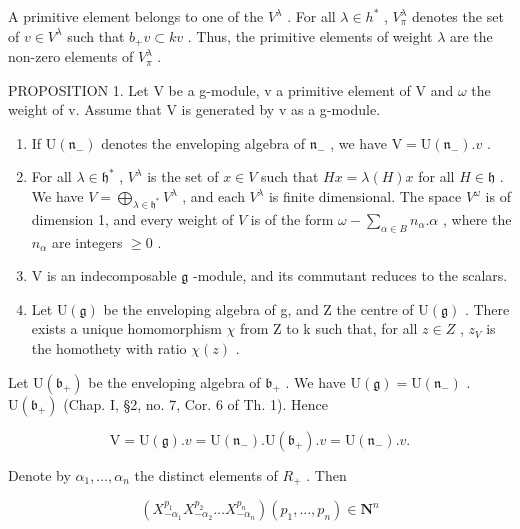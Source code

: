 A primitive element belongs to one of the \(V^{\lambda}\) . For all \(\lambda\in h^{*}\) , \(V_{\pi}^{\lambda}\) denotes the set of \(v\in V^{\lambda}\) such that \(b_{+}v\subset kv\) . Thus, the primitive elements of weight \(\lambda\) are the non-zero elements of \(V_{\pi}^{\lambda}\) .

PROPOSITION 1. Let V be a g-module, v a primitive element of V and \(\omega\) the weight of v. Assume that V is generated by v as a g-module.

\begin{enumerate}
\def\labelenumi{(\roman{enumi})}
\item
  If \(\mathrm{U}(\mathfrak{n}_{-})\) denotes the enveloping algebra of \(\mathfrak{n}_{-}\) , we have \(\mathrm{V} = \mathrm{U}(\mathfrak{n}_{-}).v\) .
\item
  For all \(\lambda \in \mathfrak{h}^*\) , \(V^{\lambda}\) is the set of \(x \in V\) such that \(Hx = \lambda(H)x\) for all \(H \in \mathfrak{h}\) . We have \(V = \bigoplus_{\lambda \in \mathfrak{h}^*} V^{\lambda}\) , and each \(V^{\lambda}\) is finite dimensional. The space \(V^{\omega}\) is of dimension 1, and every weight of \(V\) is of the form \(\omega - \sum_{\alpha \in B} n_{\alpha}. \alpha\) , where the \(n_{\alpha}\) are integers \(\geq 0\) .
\item
  V is an indecomposable \(\mathfrak{g}\) -module, and its commutant reduces to the scalars.
\item
  Let \(\mathrm{U}(\mathfrak{g})\) be the enveloping algebra of g, and Z the centre of \(\mathrm{U}(\mathfrak{g})\) . There exists a unique homomorphism \(\chi\) from Z to k such that, for all \(z \in Z\) , \(z_{V}\) is the homothety with ratio \(\chi(z)\) .
\end{enumerate}

Let \(\mathrm{U}(\mathfrak{b}_{+})\) be the enveloping algebra of \(\mathfrak{b}_{+}\) . We have \(\mathrm{U}(\mathfrak{g}) = \mathrm{U}(\mathfrak{n}_{-})\) . \(\mathrm{U}(\mathfrak{b}_{+})\) (Chap. I, §2, no. 7, Cor. 6 of Th. 1). Hence

\[
\mathrm{V} = \mathrm{U} (\mathfrak {g}). v = \mathrm{U} (\mathfrak {n} _ {-}). \mathrm{U} (\mathfrak {b} _ {+}). v = \mathrm{U} (\mathfrak {n} _ {-}). v.
\]

Denote by \(\alpha_{1},\ldots,\alpha_{n}\) the distinct elements of \(R_{+}\) . Then

\[
\left(X _ {- \alpha_ {1}} ^ {p _ {1}} X _ {- \alpha_ {2}} ^ {p _ {2}} \dots X _ {- \alpha_ {n}} ^ {p _ {n}}\right) (p _ {1}, \ldots , p _ {n}) \in \mathbf {N} ^ {n}
\]

